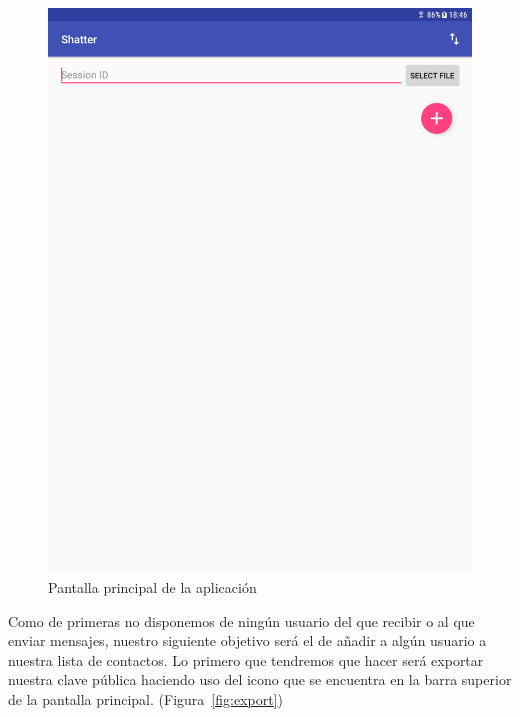 \begin{figure}[ht]
  \centering
  \includegraphics[scale=0.2]{Figures/home}
  \decoRule
  \caption[Shatter (Home)]{Pantalla principal de la aplicación}
  \label{fig:home}
\end{figure}

Como de primeras no disponemos de ningún usuario del que recibir o al que
enviar mensajes, nuestro siguiente objetivo será el de añadir a algún usuario a
nuestra lista de contactos. Lo primero que tendremos que hacer será exportar
nuestra clave pública haciendo uso del icono que se encuentra en la barra
superior de la pantalla principal. (Figura~\ref{fig:export})

